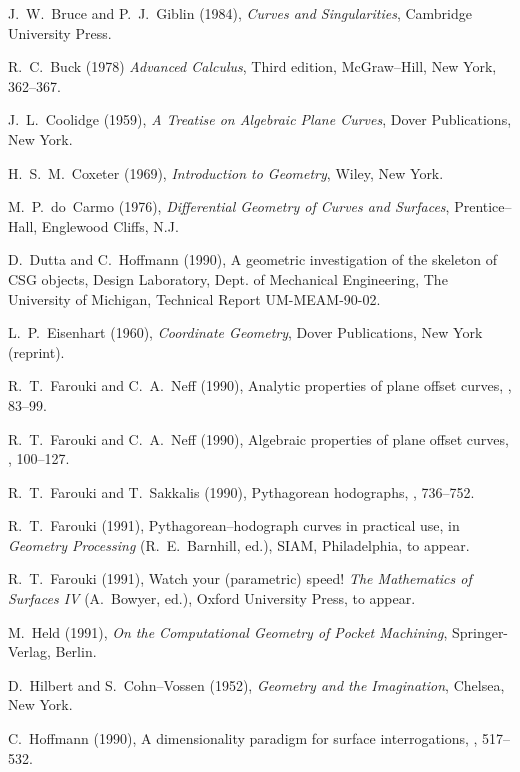 \begin{thebibliography}{99}

J.~W.~Bruce and P.~J.~Giblin (1984), {\it Curves and Singularities},
Cambridge University Press.

R.~C.~Buck (1978) {\it Advanced Calculus}, Third edition, McGraw--Hill,
New York, 362--367.

J.~L.~Coolidge (1959), {\it A Treatise on Algebraic Plane Curves},
Dover Publications, New York.

H.~S.~M.~Coxeter (1969), {\it Introduction to Geometry}, Wiley,
New York.

M.~P.~do~Carmo (1976), {\it Differential Geometry of Curves and
Surfaces}, Prentice--Hall, Englewood Cliffs, N.J.

D.~Dutta and C.~Hoffmann (1990), A geometric investigation of the skeleton 
of CSG objects, Design Laboratory, Dept. of Mechanical Engineering, 
The University of Michigan, Technical Report UM-MEAM-90-02.

L.~P.~Eisenhart (1960), {\it Coordinate Geometry}, Dover Publications,
New York (reprint).

R.~T.~Farouki and C.~A.~Neff (1990), Analytic properties of plane
offset curves, , 83--99.

R.~T.~Farouki and C.~A.~Neff (1990), Algebraic properties of plane
offset curves, , 100--127.

R.~T.~Farouki and T.~Sakkalis (1990), Pythagorean hodographs,
, 736--752.

R.~T.~Farouki (1991), Pythagorean--hodograph curves in practical
use, in {\it Geometry Processing\/} (R.~E.~Barnhill, ed.), SIAM,
Philadelphia, to appear.

R.~T.~Farouki (1991), Watch your (parametric) speed! {\it The
Mathematics of Surfaces IV\/} (A.~Bowyer, ed.), Oxford University
Press, to appear.

M.~Held (1991), {\it On the Computational Geometry of Pocket Machining},
Springer-Verlag, Berlin.

D.~Hilbert and S.~Cohn--Vossen (1952),
{\it Geometry and the Imagination},
Chelsea, New York.

C.~Hoffmann (1990), A dimensionality paradigm for surface interrogations,
, 517--532.


\end{thebibliography}
